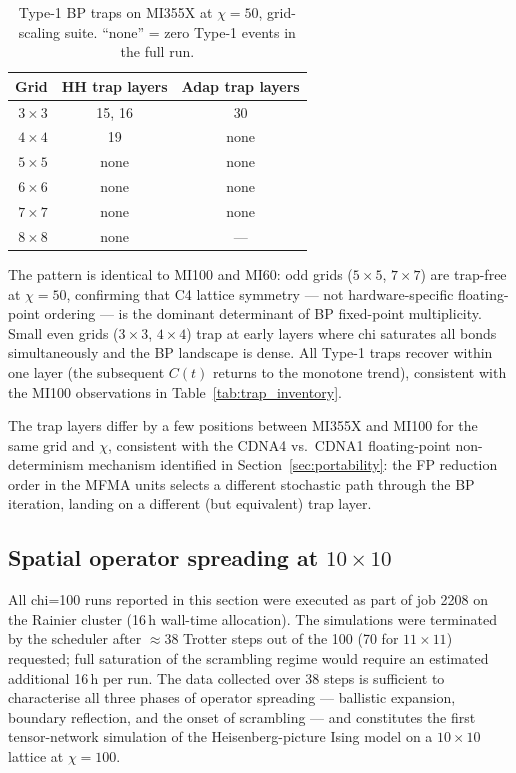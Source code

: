 \begin{table}[ht]
\centering
\caption{Type-1 BP traps on MI355X at $\chi=50$, grid-scaling suite.
  ``none'' = zero Type-1 events in the full run.}
\label{tab:traps_mi355x}
\smallskip
\small
\begin{tabular}{r cc}
\toprule
Grid    & HH trap layers & Adap trap layers \\
\midrule
$3\times3$ & 15, 16         & 30               \\
$4\times4$ & 19             & none             \\
$5\times5$ & none           & none             \\
$6\times6$ & none           & none             \\
$7\times7$ & none           & none             \\
$8\times8$ & none           & ---              \\
\bottomrule
\end{tabular}
\end{table}

The pattern is identical to MI100 and MI60: odd grids ($5\times5$, $7\times7$)
are trap-free at $\chi=50$, confirming that C4 lattice symmetry --- not
hardware-specific floating-point ordering --- is the dominant determinant of BP
fixed-point multiplicity.
Small even grids ($3\times3$, $4\times4$) trap at early layers where chi
saturates all bonds simultaneously and the BP landscape is dense.
All Type-1 traps recover within one layer (the subsequent $C(t)$ returns to the
monotone trend), consistent with the MI100 observations in
Table~\ref{tab:trap_inventory}.

The trap layers differ by a few positions between MI355X and MI100 for the same
grid and $\chi$, consistent with the CDNA4 vs.\ CDNA1 floating-point non-determinism
mechanism identified in Section~\ref{sec:portability}: the FP reduction order in
the MFMA units selects a different stochastic path through the BP iteration,
landing on a different (but equivalent) trap layer.

\subsection*{Spatial operator spreading at $10\times10$}

All chi=100 runs reported in this section were executed as part of job 2208
on the Rainier cluster (16\,h wall-time allocation).
The simulations were terminated by the scheduler after ${\approx}38$ Trotter
steps out of the 100 (70 for $11\times11$) requested; full saturation of the
scrambling regime would require an estimated additional 16\,h per run.
The data collected over 38 steps is sufficient to characterise all three
phases of operator spreading --- ballistic expansion, boundary reflection,
and the onset of scrambling --- and constitutes the first tensor-network
simulation of the Heisenberg-picture Ising model on a $10\times10$ lattice
at $\chi=100$.

